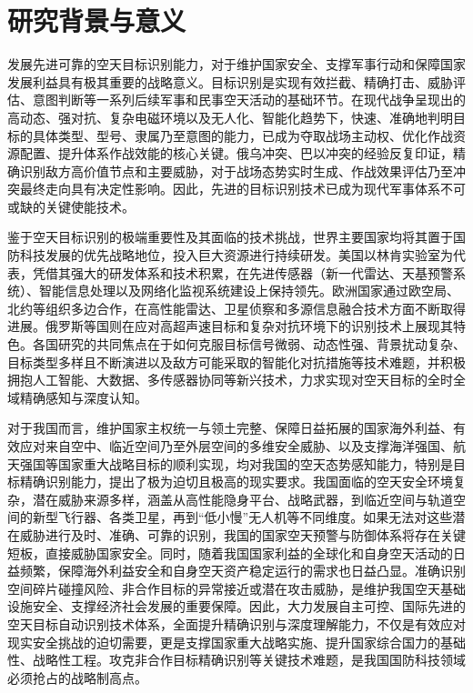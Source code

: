 \section{研究背景与意义}
\label{sec:background_significance} %
发展先进可靠的空天目标识别能力，对于维护国家安全、支撑军事行动和保障国家发展利益具有极其重要的战略意义。目标识别是实现有效拦截、精确打击、威胁评估、意图判断等一系列后续军事和民事空天活动的基础环节。在现代战争呈现出的高动态、强对抗、复杂电磁环境以及无人化、智能化趋势下，快速、准确地判明目标的具体类型、型号、隶属乃至意图的能力，已成为夺取战场主动权、优化作战资源配置、提升体系作战效能的核心关键。俄乌冲突、巴以冲突的经验反复印证，精确识别敌方高价值节点和主要威胁，对于战场态势实时生成、作战效果评估乃至冲突最终走向具有决定性影响。因此，先进的目标识别技术已成为现代军事体系不可或缺的关键使能技术。

鉴于空天目标识别的极端重要性及其面临的技术挑战，世界主要国家均将其置于国防科技发展的优先战略地位，投入巨大资源进行持续研发。美国以林肯实验室为代表，凭借其强大的研发体系和技术积累，在先进传感器（新一代雷达、天基预警系统）、智能信息处理以及网络化监视系统建设上保持领先。欧洲国家通过欧空局、北约等组织多边合作，在高性能雷达、卫星侦察和多源信息融合技术方面不断取得进展。俄罗斯等国则在应对高超声速目标和复杂对抗环境下的识别技术上展现其特色。各国研究的共同焦点在于如何克服目标信号微弱、动态性强、背景扰动复杂、目标类型多样且不断演进以及敌方可能采取的智能化对抗措施等技术难题，并积极拥抱人工智能、大数据、多传感器协同等新兴技术，力求实现对空天目标的全时全域精确感知与深度认知。

对于我国而言，维护国家主权统一与领土完整、保障日益拓展的国家海外利益、有效应对来自空中、临近空间乃至外层空间的多维安全威胁、以及支撑海洋强国、航天强国等国家重大战略目标的顺利实现，均对我国的空天态势感知能力，特别是目标精确识别能力，提出了极为迫切且极高的现实要求。我国面临的空天安全环境复杂，潜在威胁来源多样，涵盖从高性能隐身平台、战略武器，到临近空间与轨道空间的新型飞行器、各类卫星，再到“低小慢”无人机等不同维度。如果无法对这些潜在威胁进行及时、准确、可靠的识别，我国的国家空天预警与防御体系将存在关键短板，直接威胁国家安全。同时，随着我国国家利益的全球化和自身空天活动的日益频繁，保障海外利益安全和自身空天资产稳定运行的需求也日益凸显。准确识别空间碎片碰撞风险、非合作目标的异常接近或潜在攻击威胁，是维护我国空天基础设施安全、支撑经济社会发展的重要保障。因此，大力发展自主可控、国际先进的空天目标自动识别技术体系，全面提升精确识别与深度理解能力，不仅是有效应对现实安全挑战的迫切需要，更是支撑国家重大战略实施、提升国家综合国力的基础性、战略性工程。攻克非合作目标精确识别等关键技术难题，是我国国防科技领域必须抢占的战略制高点。

